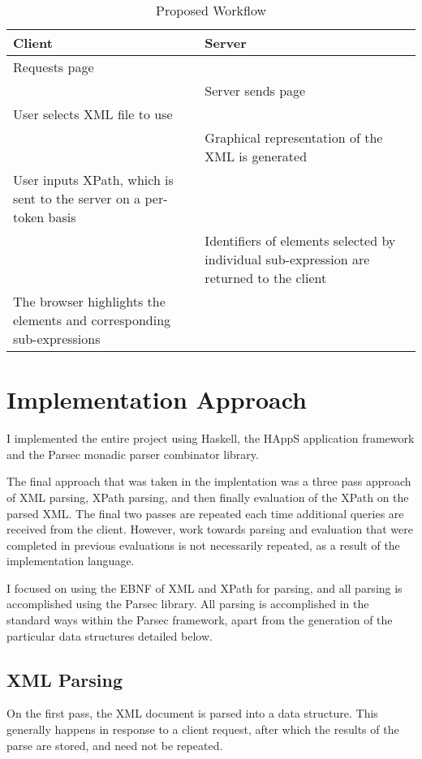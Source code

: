 \documentclass{acm_proc_article-sp}
\begin{document}
\begin{table}[!htpb]
\caption{Proposed Workflow}
\label{browser-interaction}
\centering
\begin{tabular*}{.45\textwidth}{p{} | p{}}
\textbf{Client}					&	\textbf{Server}\\
\hline
\hline
Requests page					&	\\
\hline
								&	Server sends page\\
\hline
User selects XML file to use	&	\\
\hline
								&	Graphical representation of the XML is generated \\
\hline
User inputs XPath, which is sent to the server on a per-token basis & \\
\hline
								& Identifiers of elements selected by individual
 sub-expression are returned to the client \\
\hline The browser highlights the elements and corresponding sub-expressions & \\
\end{tabular*}
\end{table}

\section{Implementation Approach}

I implemented the entire project using Haskell, the HAppS\cite{HAppS}  application framework and the Parsec\cite{parsec} monadic parser combinator library.

The final approach that was taken in the implentation was a three pass approach of XML parsing, XPath parsing, and then finally evaluation of the XPath on the parsed XML.  The final two passes are repeated each time additional queries are received from the client.  However, work towards parsing and evaluation that were completed in previous evaluations is not necessarily repeated, as a result of the implementation language.

I focused on using the EBNF of XML and XPath for parsing, and all parsing is accomplished using the Parsec library. All parsing is accomplished in the standard ways within the Parsec framework, apart from the generation of the particular data structures detailed below.

\subsection{XML Parsing}
On the first pass, the XML document is parsed into a data structure.  This generally happens in response to a client request, after which the results of the parse are stored, and need not be repeated. 
\end{document}
